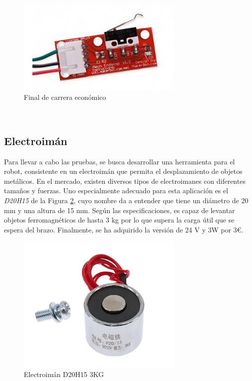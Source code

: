 \begin{figure} [ht!]
  \begin{center}
    \includegraphics[width=8cm]{figs/finaldecarrera.jpg}
  \end{center}
  \caption{Final de carrera económico}
  \label{fig:finalcarrera}
\end{figure}\ 

\subsection{Electroimán}
\noindent Para llevar a cabo las pruebas, se busca desarrollar una herramienta para el robot, consistente en un electroimán que permita 
el desplazamiento de objetos metálicos. En el mercado, existen diversos tipos de electroimanes con diferentes tamaños y fuerzas. Uno 
especialmente adecuado para esta aplicación es el \textit{D20H15} de la Figura \ref{fig:d20}, cuyo nombre da a entender que tiene un diámetro de 20 mm y una altura de 15 mm. 
Según las especificaciones, es capaz de levantar objetos ferromagnéticos de hasta 3 kg por lo que supera la carga útil que se espera del brazo. Finalmente, 
se ha adquirido la versión de 24 V y 3W por 3\euro.

\begin{figure} [ht!]
  \begin{center}
    \includegraphics[width=8cm]{figs/d20h15.jpg}
  \end{center}
  \caption{Electroimán D20H15 3KG}
  \label{fig:d20}
\end{figure}\ 


